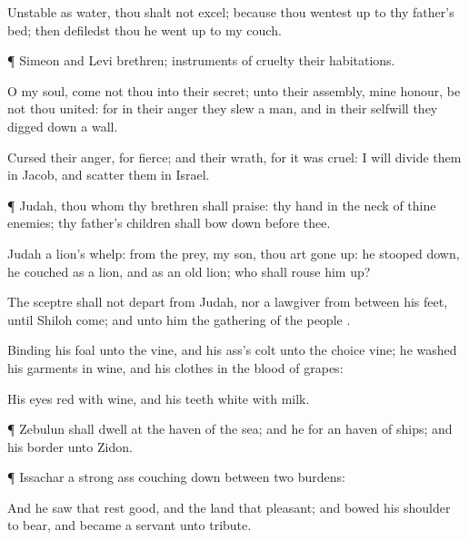 {Unstable as
water, thou shalt not
excel; because thou wentest
up to thy
father’s
bed; then defiledst
thou
{} he went
up to my
couch.


\par }{\PP {}¶
Simeon and
Levi
{}
brethren;
instruments of
cruelty
{} their
habitations.

O my
soul,
come not thou into their
secret; unto their
assembly, mine
honour, be not thou
united: for in their
anger they
slew a
man, and in their
selfwill they digged
down a
wall.

Cursed
{} their
anger, for
{}
fierce; and their
wrath, for it was
cruel: I will
divide them in
Jacob, and
scatter them in
Israel.


\par }{\PP {}¶
Judah, thou
{} whom thy
brethren shall
praise: thy
hand
{} in the
neck of thine
enemies; thy
father’s
children shall bow
down before thee.

Judah
{} a
lion’s
whelp: from the
prey, my
son, thou art gone
up: he stooped
down, he
couched as a
lion, and as an old
lion; who shall rouse him
up?

The
sceptre shall not
depart from
Judah, nor a
lawgiver from between his
feet,
until
Shiloh
come; and unto him
{} the
gathering of the
people
{}.

Binding his
foal unto the
vine, and his
ass’s
colt unto the choice
vine; he
washed his
garments in
wine, and his
clothes in the
blood of
grapes:

His
eyes
{}
red with
wine, and his
teeth
white with
milk.


\par }{\PP {}¶
Zebulun shall
dwell at the
haven of the
sea; and he
{} for an
haven of
ships; and his
border
{} unto
Zidon.


\par }{\PP {}¶
Issachar
{} a
strong
ass couching
down between two
burdens:

And he
saw that
rest
{}
good, and the
land that
{}
pleasant; and
bowed his
shoulder to
bear, and became a
servant unto
tribute.


}

